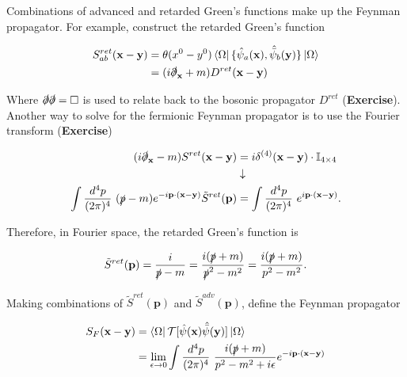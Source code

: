 \noindent Combinations of advanced and retarded Green's functions make up the Feynman propagator. For example, construct the retarded Green's function

\begin{align}
S^{ret}_{ab} (\textbf{x} - \textbf{y}) &= \theta(x^0 - y^0) \bra{\Omega} \{ \hat{\psi}_a (\textbf{x}), \hat{\bar{\psi}}_b (\textbf{y}) \} \ket{\Omega} \\
&= (i \slashed{\partial}_{\textbf{x}} + m) D^{ret} ( \textbf{x} - \textbf{y} )
\end{align}

\noindent Where $\slashed{\partial} \slashed{\partial} = \Box$ is used to relate back to the bosonic propagator $D^{ret}$ (\textbf{Exercise}). \\

\noindent Another way to solve for the fermionic Feynman propagator is to use the Fourier transform (\textbf{Exercise})

\begin{align}
(i \slashed{\partial}_{\textbf{x}} - m) S^{ret} (\textbf{x}  - \textbf{y}) &= i \delta^{(4)} (\textbf{x}  - \textbf{y})  \cdot \mathbb{I}_{4\times 4} \\
& \downarrow \\
\int \frac{d^4 p}{(2\pi)^4} \,\,  (\slashed{p} - m) e^{-i \textbf{p} \cdot (\textbf{x} - \textbf{y})} \tilde{S}^{ret}(\textbf{p}) &= \int \frac{d^4 p}{(2\pi)^4} \,\, e^{i \textbf{p} \cdot (\textbf{x} - \textbf{y})}.
\end{align}

\noindent Therefore, in Fourier space, the retarded Green's function is

\begin{equation}
\tilde{S}^{ret}(\textbf{p}) = \frac{i}{\slashed{p} - m} = \frac{i (\slashed{p} + m)}{\slashed{p}^2 - m^2} = \frac{i (\slashed{p} + m)}{p^2 - m^2}.
\end{equation}

\noindent Making combinations of $\tilde{S}^{ret}(\textbf{p})$ and $\tilde{S}^{adv}(\textbf{p})$, define the Feynman propagator

\begin{align}
S_F (\textbf{x} - \textbf{y}) &= \bra{\Omega} \mathcal{T} [ \hat{\psi} (\textbf{x}) \hat{\bar{\psi}} (\textbf{y}) ] \ket{\Omega} \\
&= \lim_{\epsilon \rightarrow 0} \int \frac{d^4 p}{(2\pi)^4} \,\,  \frac{i (\slashed{p} + m)}{p^2 - m^2 + i \epsilon} e^{-i \textbf{p} \cdot ( \textbf{x} - \textbf{y})}
\end{align}